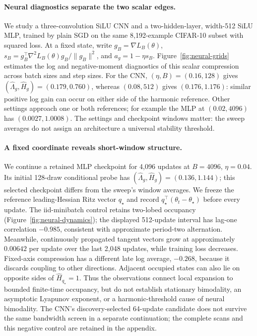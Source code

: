\paragraph{Neural diagnostics separate the two scalar edges.}
We study a three-convolution SiLU CNN and a two-hidden-layer, width-512 SiLU MLP,
trained by plain SGD on the same 8,192-example CIFAR-10 subset with squared loss.
At a fixed state, write $g_B=\nabla L_B(\theta)$,
$s_B=g_B^\top\nabla^2L_B(\theta)g_B/\|g_B\|^2$, and $a_g=1-\eta s_B$.
Figure~\ref{fig:neural-grids} estimates the log and negative-moment diagnostics of
this scalar compression across batch sizes and step sizes.
For the CNN, $(\eta,B)=(0.16,128)$ gives
$(\widehat\Lambda_g,\widehat H_g)=(0.179,0.760)$, whereas $(0.08,512)$ gives
$(0.176,1.176)$: similar positive log gain can occur on either side of the harmonic reference.
Other settings approach one or both references; for example the MLP at $(0.02,4096)$
has $(0.0027,1.0008)$.
The settings and checkpoint windows matter: the sweep averages do not assign an architecture a universal stability threshold.

\paragraph{A fixed coordinate reveals short-window structure.}
We continue a retained MLP checkpoint for 4,096 updates at $B=4096$, $\eta=0.04$.
Its initial 128-draw conditional probe has $(\widehat\Lambda_g,\widehat H_g)=(0.136,1.144)$;
this selected checkpoint differs from the sweep's window averages.
We freeze the reference leading-Hessian Ritz vector $q_\star$ and record
$q_\star^\top(\theta_t-\theta_\star)$ before every update.
The iid-minibatch control retains two-lobed occupancy
(Figure~\ref{fig:neural-dynamics}); the displayed 512-update interval has lag-one
correlation $-0.985$, consistent with approximate period-two alternation.
Meanwhile, continuously propagated tangent vectors grow at approximately
$0.00642$ per update over the last 2,048 updates, while training loss decreases.
Fixed-axis compression has a different late log average, $-0.268$, because it discards coupling to other directions.
Adjacent occupied states can also lie on opposite sides of $\widehat H_{q_\star}=1$.
Thus the observations connect local expansion to bounded finite-time occupancy,
but do not establish stationary bimodality, an asymptotic Lyapunov exponent,
or a harmonic-threshold cause of neural bimodality.
The CNN's discovery-selected 64-update candidate does not survive the same bandwidth screen
in a separate continuation; the complete scans and this negative control are retained in the appendix.
